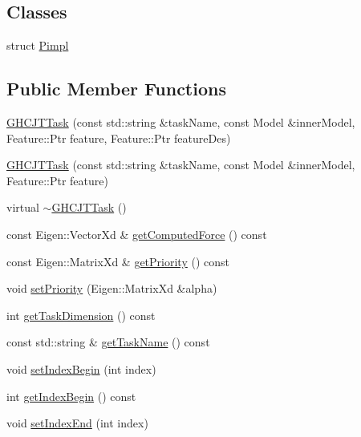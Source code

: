 \subsection*{Classes}
\begin{DoxyCompactItemize}
\item 
struct \hyperlink{structgocra_1_1GHCJTTask_1_1Pimpl}{Pimpl}
\end{DoxyCompactItemize}
\subsection*{Public Member Functions}
\begin{DoxyCompactItemize}
\item 
\hyperlink{classgocra_1_1GHCJTTask_a9161a72cfe5261e5a3580fba578ef23f}{G\+H\+C\+J\+T\+Task} (const std\+::string \&task\+Name, const Model \&inner\+Model, Feature\+::\+Ptr feature, Feature\+::\+Ptr feature\+Des)
\item 
\hyperlink{classgocra_1_1GHCJTTask_a45a0f844d1e8e3a2d500da01a6606a03}{G\+H\+C\+J\+T\+Task} (const std\+::string \&task\+Name, const Model \&inner\+Model, Feature\+::\+Ptr feature)
\item 
virtual \hyperlink{classgocra_1_1GHCJTTask_a258ac19e0b4a3aab26b4aebfeb2c26d8}{$\sim$\+G\+H\+C\+J\+T\+Task} ()
\item 
const Eigen\+::\+Vector\+Xd \& \hyperlink{classgocra_1_1GHCJTTask_a088d67ee49cbdc57ad2b77e2d89afae0}{get\+Computed\+Force} () const
\item 
const Eigen\+::\+Matrix\+Xd \& \hyperlink{classgocra_1_1GHCJTTask_a3f9898bd47735158641a52ac36be2801}{get\+Priority} () const
\item 
void \hyperlink{classgocra_1_1GHCJTTask_a5dce074858a320d3277eb5e0c8fc1d0c}{set\+Priority} (Eigen\+::\+Matrix\+Xd \&alpha)
\item 
int \hyperlink{classgocra_1_1GHCJTTask_a7c7f6781003d4ecad41e65fd417ddf48}{get\+Task\+Dimension} () const
\item 
const std\+::string \& \hyperlink{classgocra_1_1GHCJTTask_ac382ad3227454bc831ce5930c7a7519a}{get\+Task\+Name} () const
\item 
void \hyperlink{classgocra_1_1GHCJTTask_adb7d719214756cc13927b3587b4e6219}{set\+Index\+Begin} (int index)
\item 
int \hyperlink{classgocra_1_1GHCJTTask_ab7732146f0db17c8a7b0f1c2d7c163a1}{get\+Index\+Begin} () const
\item 
void \hyperlink{classgocra_1_1GHCJTTask_a26739b301ace2b23b7217f5aa18afd5e}{set\+Index\+End} (int index)

\end{DoxyCompactItemize}

